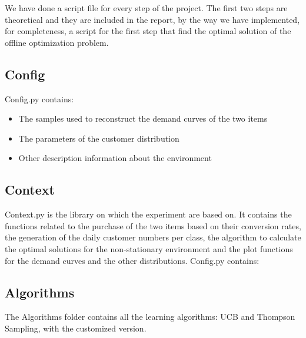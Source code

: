 We have done a script file for every step of the project. The first two steps are theoretical and they are included in the report, by the way we have implemented, for completeness, a script for the first step that find the optimal solution of the offline optimization problem.
\subsection*{Config}
Config.py contains:
\begin{itemize}
	\item The samples used to reconstruct the demand curves of the two items
	\item The parameters of the customer distribution
	\item Other description information about the environment
\end{itemize} 

\subsection*{Context}
Context.py is the library on which the experiment are based on. It contains the functions related to the purchase of the two items based on their conversion rates, the generation of the daily customer numbers per class, the algorithm to calculate the optimal solutions for the non-stationary environment and the plot functions for the demand curves and the other distributions.
Config.py contains:

\subsection*{Algorithms}
The Algorithms folder contains all the learning algorithms: UCB and Thompson Sampling, with the customized version.